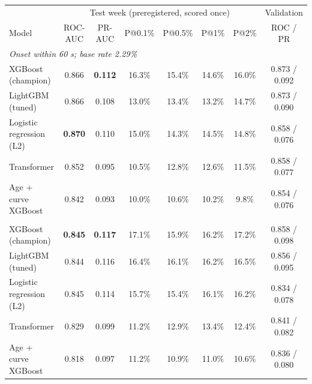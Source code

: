 \begin{tabular}{lccccccc}
\toprule
 & \multicolumn{6}{c}{Test week (preregistered, scored once)} & Validation \\
\cmidrule(lr){2-7}\cmidrule(lr){8-8}
Model & ROC-AUC & PR-AUC & P@0.1\% & P@0.5\% & P@1\% & P@2\% & ROC / PR \\
\midrule
\multicolumn{8}{l}{\emph{Onset within 60 s; base rate 2.29\%}} \\
XGBoost (champion) & 0.866 & \textbf{0.112} & 16.3\% & 15.4\% & 14.6\% & 16.0\% & 0.873 / 0.092 \\
LightGBM (tuned) & 0.866 & 0.108 & 13.0\% & 13.4\% & 13.2\% & 14.7\% & 0.873 / 0.090 \\
Logistic regression (L2) & \textbf{0.870} & 0.110 & 15.0\% & 14.3\% & 14.5\% & 14.8\% & 0.858 / 0.076 \\
Transformer & 0.852 & 0.095 & 10.5\% & 12.8\% & 12.6\% & 11.5\% & 0.858 / 0.077 \\
Age + curve XGBoost & 0.842 & 0.093 & 10.0\% & 10.6\% & 10.2\% & 9.8\% & 0.854 / 0.076 \\
\addlinespace
\multicolumn{8}{l}{\emph{Onset within 300 s; base rate 2.73\%}} \\
XGBoost (champion) & \textbf{0.845} & \textbf{0.117} & 17.1\% & 15.9\% & 16.2\% & 17.2\% & 0.858 / 0.098 \\
LightGBM (tuned) & 0.844 & 0.116 & 16.4\% & 16.1\% & 16.2\% & 16.5\% & 0.856 / 0.095 \\
Logistic regression (L2) & 0.845 & 0.114 & 15.7\% & 15.4\% & 16.1\% & 16.2\% & 0.834 / 0.078 \\
Transformer & 0.829 & 0.099 & 11.2\% & 12.9\% & 13.4\% & 12.4\% & 0.841 / 0.082 \\
Age + curve XGBoost & 0.818 & 0.097 & 11.2\% & 10.9\% & 11.0\% & 10.6\% & 0.836 / 0.080 \\
\bottomrule
\end{tabular}
